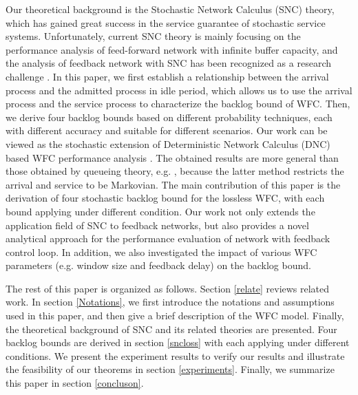 \documentclass[12pt]{article}
\begin{document}
Our theoretical background is the Stochastic Network Calculus (SNC) \cite{Chan94,jiang2006basic,Ciucu2006Scaling,5984844,Fidl06} theory, which has gained great success in the service guarantee of stochastic service systems. Unfortunately, current SNC theory is mainly focusing on the performance analysis of feed-forward network with infinite buffer capacity, and the analysis of feedback network with SNC has been recognized as a research challenge \cite{JiangLiu-15877}. In this paper, we first establish a relationship between the arrival process and the admitted process in idle period, which allows us to use the arrival process and the service process to characterize the backlog bound of WFC. Then, we derive four backlog bounds based on different probability techniques, each with different accuracy and suitable for different scenarios. Our work can be viewed as the stochastic extension of Deterministic Network Calculus (DNC) based WFC performance analysis \cite{CrOk96,AgRa96,Chan98,ACOR99,QLDD09FC,bose2006analysis,Qian2010Analysis}. The obtained results are more general than those obtained by queueing theory, e.g. \cite{1095377,jung1996analysis}, because the latter method restricts the arrival and service to be Markovian. The main contribution of this paper is the derivation of four stochastic backlog bound for the lossless WFC, with each bound applying under different condition. Our work not only extends the application field of SNC to feedback networks, but also provides a novel analytical approach for the performance evaluation of network with feedback control loop. In addition, we also investigated the impact of various WFC parameters (e.g. window size and feedback delay) on the backlog bound.

The rest of this paper is organized as follows. Section \ref{relate} reviews related work. In section \ref{Notations}, we first introduce the notations and assumptions used in this paper, and then give a brief description of the WFC model. Finally, the theoretical background of SNC and its related theories are presented. Four backlog bounds are derived in section \ref{sncloss} with each applying under different conditions. We present the experiment results to verify our results and illustrate the feasibility of our theorems in section \ref{experiments}. Finally, we summarize this paper in section \ref{concluson}.
\end{document}

